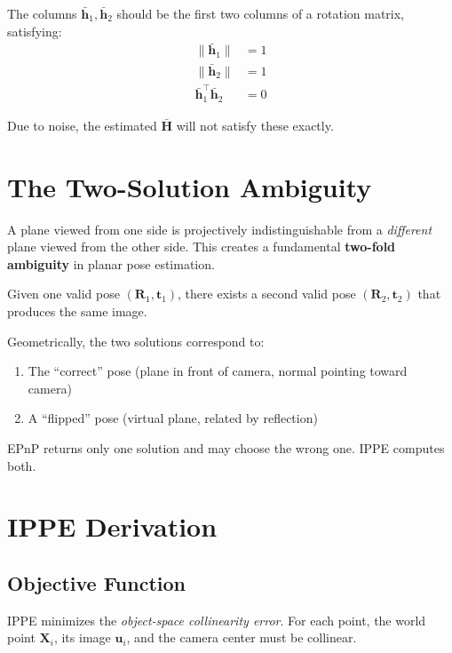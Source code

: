 \documentclass[11pt]{article}
\newcommand{\vect}[1]{\mathbf{#1}}
\newcommand{\mat}[1]{\mathbf{#1}}
\begin{document}
The columns $\bar{\vect{h}}_1, \bar{\vect{h}}_2$ should be the first two columns of a rotation matrix, satisfying:
\begin{align}
\|\bar{\vect{h}}_1\| &= 1 \label{eq:norm1}\\
\|\bar{\vect{h}}_2\| &= 1 \label{eq:norm2}\\
\bar{\vect{h}}_1^\top \bar{\vect{h}}_2 &= 0 \label{eq:ortho}
\end{align}

Due to noise, the estimated $\bar{\mat{H}}$ will not satisfy these exactly.

\section{The Two-Solution Ambiguity}

\begin{planarbox}
A plane viewed from one side is projectively indistinguishable from a \emph{different} plane viewed from the other side. This creates a fundamental \textbf{two-fold ambiguity} in planar pose estimation.

Given one valid pose $(\mat{R}_1, \vect{t}_1)$, there exists a second valid pose $(\mat{R}_2, \vect{t}_2)$ that produces the same image.
\end{planarbox}

Geometrically, the two solutions correspond to:
\begin{enumerate}
    \item The ``correct'' pose (plane in front of camera, normal pointing toward camera)
    \item A ``flipped'' pose (virtual plane, related by reflection)
\end{enumerate}

EPnP returns only one solution and may choose the wrong one. IPPE computes both.

\section{IPPE Derivation}

\subsection{Objective Function}

IPPE minimizes the \emph{object-space collinearity error}. For each point, the world point $\vect{X}_i$, its image $\vect{u}_i$, and the camera center must be collinear.
\end{document}
